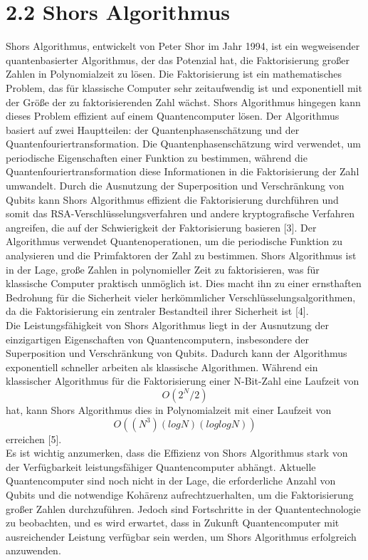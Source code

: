 \section{2.2 Shors Algorithmus}
Shors Algorithmus, entwickelt von Peter Shor im Jahr 1994, ist ein wegweisender quantenbasierter Algorithmus, der das Potenzial hat, die Faktorisierung großer Zahlen in Polynomialzeit zu lösen. Die Faktorisierung ist ein mathematisches Problem, das für klassische Computer sehr zeitaufwendig ist und exponentiell mit der Größe der zu faktorisierenden Zahl wächst. Shors Algorithmus hingegen kann dieses Problem effizient auf einem Quantencomputer lösen.
Der Algorithmus basiert auf zwei Hauptteilen: der Quantenphasenschätzung und der Quantenfouriertransformation. Die Quantenphasenschätzung wird verwendet, um periodische Eigenschaften einer Funktion zu bestimmen, während die Quantenfouriertransformation diese Informationen in die Faktorisierung der Zahl umwandelt. Durch die Ausnutzung der Superposition und Verschränkung von Qubits kann Shors Algorithmus effizient die Faktorisierung durchführen und somit das RSA-Verschlüsselungsverfahren und andere kryptografische Verfahren angreifen, die auf der Schwierigkeit der Faktorisierung basieren [3].
Der Algorithmus verwendet Quantenoperationen, um die periodische Funktion zu analysieren und die Primfaktoren der Zahl zu bestimmen. Shors Algorithmus ist in der Lage, große Zahlen in polynomieller Zeit zu faktorisieren, was für klassische Computer praktisch unmöglich ist. Dies macht ihn zu einer ernsthaften Bedrohung für die Sicherheit vieler herkömmlicher Verschlüsselungsalgorithmen, da die Faktorisierung ein zentraler Bestandteil ihrer Sicherheit ist [4].
\\Die Leistungsfähigkeit von Shors Algorithmus liegt in der Ausnutzung der einzigartigen Eigenschaften von Quantencomputern, insbesondere der Superposition und Verschränkung von Qubits. Dadurch kann der Algorithmus exponentiell schneller arbeiten als klassische Algorithmen. Während ein klassischer Algorithmus für die Faktorisierung einer N-Bit-Zahl eine Laufzeit von \[O(2^N/2)\] hat, kann Shors Algorithmus dies in Polynomialzeit mit einer Laufzeit von \[O((N^3)(log N)(log log N))\] erreichen [5].
\\Es ist wichtig anzumerken, dass die Effizienz von Shors Algorithmus stark von der Verfügbarkeit leistungsfähiger Quantencomputer abhängt. Aktuelle Quantencomputer sind noch nicht in der Lage, die erforderliche Anzahl von Qubits und die notwendige Kohärenz aufrechtzuerhalten, um die Faktorisierung großer Zahlen durchzuführen. Jedoch sind Fortschritte in der Quantentechnologie zu beobachten, und es wird erwartet, dass in Zukunft Quantencomputer mit ausreichender Leistung verfügbar sein werden, um Shors Algorithmus erfolgreich anzuwenden.

